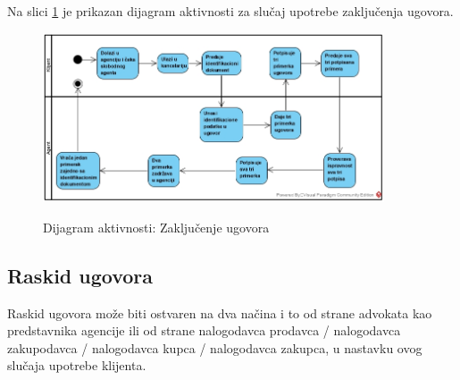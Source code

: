 \documentclass[20pt]{article}
\begin{document}
\setlength{\parindent}{1cm}
\fontsize{13}{18} \selectfont 
Na slici \ref{fig:dijagramAktivnostiZakljucenjeUgovora} je prikazan dijagram aktivnosti za slu\v {c}aj upotrebe zaklju\v {c}enja ugovora.

\begin{figure}[h]
        \centering
        \includegraphics[width=0.9\textwidth,height=0.39\textheight]{Pictures/zakljucenjeUgovora}\\
        \caption{Dijagram aktivnosti: Zaklju\v {c}enje ugovora}
        \label{fig:dijagramAktivnostiZakljucenjeUgovora}
    \end{figure}





\newpage
\subsection{\bfseries \Large Raskid ugovora}
\setlength{\parindent}{1cm}
\fontsize{13}{18} \selectfont 


\indent Raskid ugovora mo\v {z}e biti ostvaren na dva na\v {c}ina i to od strane advokata kao predstavnika agencije ili od strane
nalogodavca prodavca / nalogodavca zakupodavca / nalogodavca kupca / nalogodavca zakupca, u nastavku ovog slu\v {c}aja upotrebe klijenta.
\end{document}
